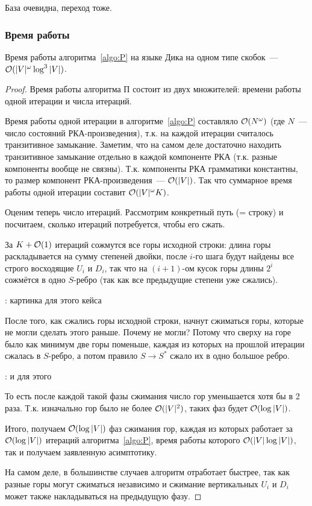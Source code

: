 База очевидна, переход тоже.

\subsubsection{Время работы}

\begin{theorem}
  Время работы алгоритма~\ref{algo:P} на языке Дика на одном типе скобок~--- $\mathcal{O}(|V|^{\omega} \log^3 |V|)$.
\end{theorem}

\begin{proof}
  Время работы алгоритма П состоит из двух множителей: времени работы одной итерации и числа итераций.

  Время работы одной итерации в алгоритме~\ref{algo:P} составляло $\mathcal{O}(N^{\omega})$ (где $N$~--- число состояний РКА-произведения), т.к. на каждой итерации считалось транзитивное замыкание. Заметим, что на самом деле достаточно находить транзитивное замыкание отдельно в каждой компоненте РКА (т.к. разные компоненты вообще не связны). Т.к. компоненты РКА грамматики константны, то размер компонент РКА-произведения~--- $\mathcal{O}(|V|)$. Так что суммарное время работы одной итерации составит $\mathcal{O}(|V|^{\omega} K)$.

  Оценим теперь число итераций. Рассмотрим конкретный путь (= строку) и посчитаем, сколько итераций потребуется, чтобы его сжать.

  За $K + \mathcal{O}(1)$ итераций сожмутся все горы исходной строки: длина горы раскладывается на сумму степеней двойки, после $i$-го шага будут найдены все строго восходящие $U_i$ и $D_i$, так что на $(i+1)$-ом кусок горы длины $2^i$ сожмётся в одно $S$-ребро (так как все предыдущие степени уже сжались).

  \TODO: картинка для этого кейса

  После того, как сжались горы исходной строки, начнут сжиматься горы, которые не могли сделать этого раньше. Почему не могли? Потому что сверху на горе было как минимум две горы поменьше, каждая из которых на прошлой итерации сжалась в $S$-ребро, а потом правило $S \to S^{*}$ сжало их в одно большое ребро. 

  \TODO: и для этого

  То есть после каждой такой фазы сжимания число гор уменьшается хотя бы в 2 раза. Т.к. изначально гор было не более $\mathcal{O}(|V|^2)$, таких фаз будет $\mathcal{O}(\log |V|)$.

  Итого, получаем $\mathcal{O}(\log |V|)$ фаз сжимания гор, каждая из которых работает за $\mathcal{O}(\log |V|)$ итераций алгоритма~\ref{algo:P}, время работы которого $\mathcal{O}(|V| \log |V|)$, так и получаем заявленную асимптотику.

  На самом деле, в большинстве случаев алгоритм отработает быстрее, так как разные горы могут сжиматься независимо и сжимание вертикальных $U_i$ и $D_i$ может также накладываться на предыдущую фазу.

\end{proof}


